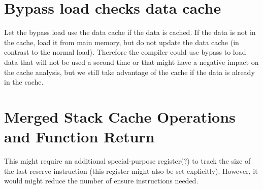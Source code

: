 \documentclass[a4paper,fontsize=10pt,twoside,DIV15,BCOR12mm,headinclude=true,footinclude=false,pagesize,bibtotoc]{scrbook}
\newcommand{\comment}[3]{

\textsf{\textbf{#1}} {\color{#3}#2}}
\newcommand{\stefan}[1]{\comment{Stefan}{#1}{RoyalPurple}}
\renewcommand{\stefan}[1]{}
\begin{document}
\stefan{Regarding having additional write ports for the register file: We could still disallow multiple parallel loads by stalling a load
instruction until the last memory op is completed (else we would also need to take some special care of stores if loads and stores can be in progress at the same
time), this would not be any worse than the current ISA (currently we cannot have multiple loads to main memory in parallel). If a load is
ready, I guess we could just stall the pipeline for one cycle to write to the register. Again, this may still be better than the
current ISA, since we do not need the code space for the additional move from special instruction, but it may cost one stall whereas the
move-from-special could be scheduled in the second slot parallel to some other operation (ok, but then its not so RISC anymore..).}

\section{Bypass load checks data cache}

Let the bypass load use the data cache if the data is cached. If the data is not in the cache, load it from main memory, but do not update
the data cache (in contrast to the normal load). Therefore the compiler could use bypass to load data that will not be used a second time or
that might have a negative impact on the cache analysis, but we still take advantage of the cache if the data is already in the cache.

\stefan{For now the bypass is defined as load always from memory, even if it is in the cache, but there is no real disadvantage to checking the
cache first (except that bypass cannot be used to achieve a perfectly stable timing). But should a bypass update the LRU if it is a cache
hit? (probably not, it should not modify the cache state).

On the other hand, for synchronization we need a bypass that \emph{always} checks main memory. For consistency reasons, we may want to
update the data cache if it contains the accessed address.}

\section{Merged Stack Cache Operations and Function Return}

This might require an additional special-purpose register(?) to track the size
of the last reserve instruction (this register might also be set explicitly).
However, it would might reduce the number of ensure instructions needed.
\end{document}

